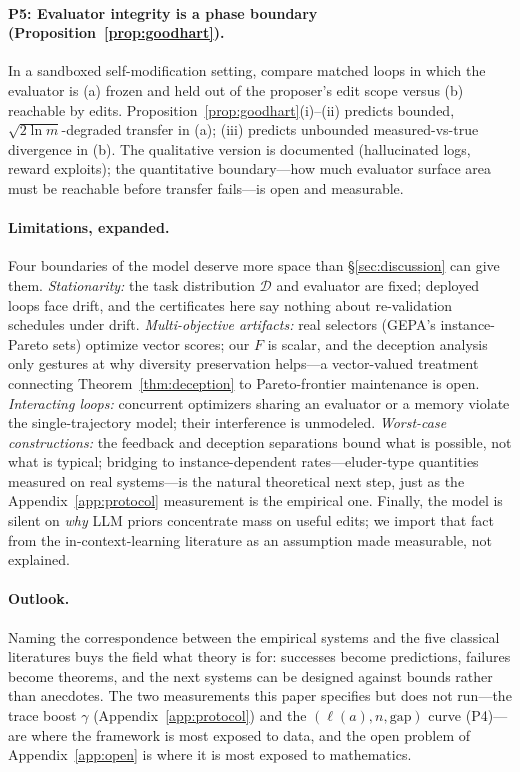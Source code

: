 \documentclass{article}
\theoremstyle{plain}
\theoremstyle{definition}
\theoremstyle{remark}
\newcommand{\D}{\mathcal{D}}
\newcommand{\len}{\ell}
\begin{document}
\paragraph{P5: Evaluator integrity is a phase boundary (Proposition~\ref{prop:goodhart}).}
In a sandboxed self-modification setting, compare matched loops in which the evaluator is (a) frozen and held out of the proposer's edit scope versus (b) reachable by edits. Proposition~\ref{prop:goodhart}(i)--(ii) predicts bounded, $\sqrt{2\ln m}$-degraded transfer in (a); (iii) predicts unbounded measured-vs-true divergence in (b). The qualitative version is documented (hallucinated logs, reward exploits); the quantitative boundary---how much evaluator surface area must be reachable before transfer fails---is open and measurable.

\paragraph{Limitations, expanded.}
Four boundaries of the model deserve more space than \S\ref{sec:discussion} can give them. \emph{Stationarity:} the task distribution $\D$ and evaluator are fixed; deployed loops face drift, and the certificates here say nothing about re-validation schedules under drift. \emph{Multi-objective artifacts:} real selectors (GEPA's instance-Pareto sets) optimize vector scores; our $F$ is scalar, and the deception analysis only gestures at why diversity preservation helps---a vector-valued treatment connecting Theorem~\ref{thm:deception} to Pareto-frontier maintenance is open. \emph{Interacting loops:} concurrent optimizers sharing an evaluator or a memory violate the single-trajectory model; their interference is unmodeled. \emph{Worst-case constructions:} the feedback and deception separations bound what is possible, not what is typical; bridging to instance-dependent rates---eluder-type quantities \citep{xu2025llf} measured on real systems---is the natural theoretical next step, just as the Appendix~\ref{app:protocol} measurement is the empirical one. Finally, the model is silent on \emph{why} LLM priors concentrate mass on useful edits; we import that fact from the in-context-learning literature \citep{xie2022explanation, akyurek2023what, vonoswald2023transformers, garg2022what} as an assumption made measurable, not explained.

\paragraph{Outlook.}
Naming the correspondence between the empirical systems and the five classical literatures buys the field what theory is for: successes become predictions, failures become theorems, and the next systems can be designed against bounds rather than anecdotes. The two measurements this paper specifies but does not run---the trace boost $\gamma$ (Appendix~\ref{app:protocol}) and the $(\len(a), n, \text{gap})$ curve (P4)---are where the framework is most exposed to data, and the open problem of Appendix~\ref{app:open} is where it is most exposed to mathematics.
\end{document}
